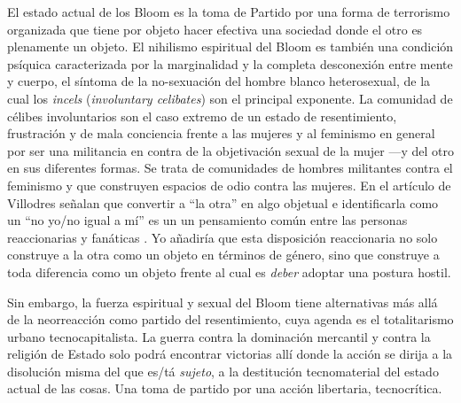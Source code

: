 El estado actual de los Bloom es la toma de Partido por una forma de terrorismo organizada que tiene por objeto hacer efectiva una sociedad donde el otro es plenamente un objeto. El nihilismo espiritual del Bloom es también una condición psíquica caracterizada por la marginalidad y la completa desconexión entre mente y cuerpo, el síntoma de la no-sexuación del hombre blanco heterosexual, de la cual los \emph{incels} (\emph{involuntary celibates}) son el principal exponente. La comunidad de célibes involuntarios son el caso extremo de un estado de resentimiento, frustración y de mala conciencia frente a las mujeres y al feminismo en general por ser una militancia en contra de la objetivación sexual de la mujer ---y del otro en sus diferentes formas. Se trata de comunidades de hombres militantes contra el feminismo y que construyen espacios de odio contra las mujeres. En el artículo de Villodres señalan que convertir a \enquote{la otra} en algo objetual e identificarla como un \enquote{no yo/no igual a mí} es un un pensamiento común entre las personas reaccionarias y fanáticas \autocite{villodresQueSonIncels2018}. Yo añadiría que esta disposición reaccionaria no solo construye a la otra como un objeto en términos de género, sino que construye a toda diferencia como un objeto frente al cual es \emph{deber} adoptar una postura hostil.

Sin embargo, la fuerza espiritual y sexual del Bloom tiene alternativas más allá de la neorreacción como partido del resentimiento, cuya agenda es el totalitarismo urbano tecnocapitalista. La guerra contra la dominación mercantil y contra la religión de Estado solo podrá encontrar victorias allí donde la acción se dirija a la disolución misma del que es/tá \emph{sujeto}, a la destitución tecnomaterial del estado actual de las cosas. Una toma de partido por una acción libertaria, tecnocrítica.

